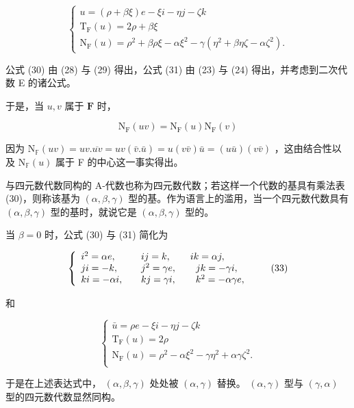 \[
\left\{ \begin{array}{c} u = (\rho + \beta \xi) e - \xi i - \eta j - \zeta k \\ \mathrm{T} _ {\mathrm{F}} (u) = 2 \rho + \beta \xi \\ \mathrm{N} _ {\mathrm{F}} (u) = \rho^ {2} + \beta \rho \xi - \alpha \xi^ {2} - \gamma (\eta^ {2} + \beta \eta \zeta - \alpha \zeta^ {2}). \end{array} \right.\tag{31}
\]

公式 (30) 由 (28) 与 (29) 得出，公式 (31) 由 (23) 与 (24) 得出，并考虑到二次代数 E 的诸公式。

于是，当 \(u, v\) 属于 \(\mathbf{F}\) 时，

\[
\mathrm{N} _ {\mathrm{F}} (u v) = \mathrm{N} _ {\mathrm{F}} (u) \mathrm{N} _ {\mathrm{F}} (v)\tag{32}
\]

因为 \(\mathrm{N}_{\mathbb{F}}(uv)=uv.\overline{uv}=uv(\bar{v}.\bar{u})=u(v\bar{v})\bar{u}=(u\bar{u})(v\bar{v})\) ，这由结合性以及 \(\mathrm{N}_{\mathbb{F}}(u)\) 属于 F 的中心这一事实得出。

与四元数代数同构的 A-代数也称为四元数代数；若这样一个代数的基具有乘法表 (30)，则称该基为 \((\alpha, \beta, \gamma)\) 型的基。作为语言上的滥用，当一个四元数代数具有 \((\alpha, \beta, \gamma)\) 型的基时，就说它是 \((\alpha, \beta, \gamma)\) 型的。

当 \(\beta = 0\) 时，公式 (30) 与 (31) 简化为

\[
\left\{ \begin{array}{l l} i ^ {2} = \alpha e, & \quad i j = k, \qquad i k = \alpha j, \\ j i = - k, & \quad j ^ {2} = \gamma e, \qquad j k = - \gamma i, \\ k i = - \alpha i, & \quad k j = \gamma i, \qquad k ^ {2} = - \alpha \gamma e, \end{array} \right.\tag{33}
\]

和

\[
\left\{ \begin{array} {c}\bar {u} = \rho e - \xi i - \eta j - \zeta k \\ \mathrm{T} _ {\mathrm{F}} (u) = 2 \rho \\ \mathrm{N} _ {\mathrm{F}} (u) = \rho^ {2} - \alpha \xi^ {2} - \gamma \eta^ {2} + \alpha \gamma \zeta^ {2}. \\ \end{array} \right.\tag{34}
\]

于是在上述表达式中， \((\alpha, \beta, \gamma)\) 处处被 \((\alpha, \gamma)\) 替换。 \((\alpha, \gamma)\) 型与 \((\gamma, \alpha)\) 型的四元数代数显然同构。

